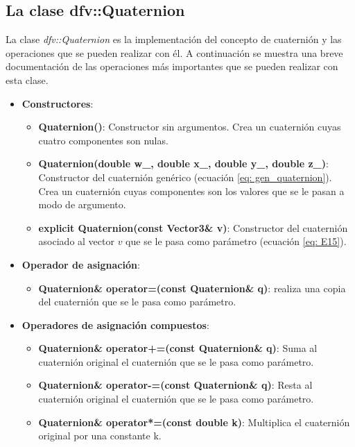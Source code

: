 \documentclass[12pt, a4paper]{report}
\begin{document}
\subsection{La clase dfv::Quaternion}

La clase \textit{dfv::Quaternion} es la implementación del concepto de cuaternión y las operaciones que se pueden realizar con él. A continuación se muestra una breve documentación de las operaciones más importantes que se pueden realizar con esta clase.

\begin{itemize}

\item \textbf{Constructores}:

\begin{itemize}
\item \textbf{Quaternion()}: Constructor sin argumentos. Crea un cuaternión cuyas cuatro componentes son nulas.

\item \textbf{Quaternion(double w\_, double x\_, double y\_, double z\_)}: Constructor del cuaternión genérico (ecuación \eqref{eq: gen_quaternion}). Crea un cuaternión cuyas componentes son los valores que se le pasan a modo de argumento.

\item \textbf{explicit Quaternion(const Vector3\& v)}: Constructor del cuaternión asociado al vector $v$ que se le pasa como parámetro (ecuación \eqref{eq: E15}). 
\end{itemize}

\item \textbf{Operador de asignación}:

\begin{itemize}
\item \textbf{Quaternion\& operator=(const Quaternion\& q)}: realiza una copia del cuaternión que se le pasa como parámetro.
\end{itemize} 

\item \textbf{Operadores de asignación compuestos}:

\begin{itemize}
\item \textbf{Quaternion\& operator+=(const Quaternion\& q)}: Suma al cuaternión original el cuaternión que se le pasa como parámetro.
\item \textbf{Quaternion\& operator-=(const Quaternion\& q)}: Resta al cuaternión original el cuaternión que se le pasa como parámetro.
\item \textbf{Quaternion\& operator*=(const double k)}: Multiplica el cuaternión original por una constante k.


\end{itemize}
\end{itemize}
\end{document}
